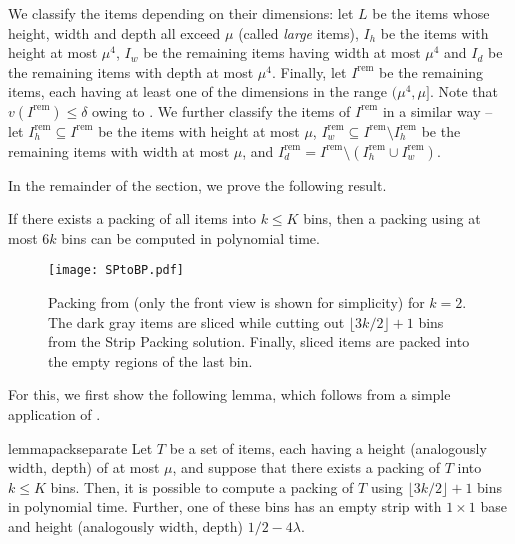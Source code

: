 \documentclass[a4paper,UKenglish,cleveref, autoref, thm-restate]{lipics-v2021}
\renewcommand{\epsilon}{\lambda}
\begin{document}
We classify the items depending on their dimensions: let $L$ be the items whose height, width and depth all exceed $\mu$ (called \emph{large} items), $I_h$ be the items with height at most $\mu^4$, $I_w$ be the remaining items having width at most $\mu^4$ and $I_d$ be the remaining items with depth at most $\mu^4$. Finally, let $I^{\text{rem}}$ be the remaining items, each having at least one of the dimensions in the range $(\mu^4,\mu]$. Note that $v(I^{\text{rem}})\le \delta$ owing to . We further classify the items of $I^{\text{rem}}$ in a similar way -- let $I^{\text{rem}}_h \subseteq I^{\text{rem}}$ be the items with height at most $\mu$, $I^{\text{rem}}_w \subseteq I^{\text{rem}}\setminus I^{\text{rem}}_h$ be the remaining items with width at most $\mu$, and $I^{\text{rem}}_d = I^{\text{rem}} \setminus (I^{\text{rem}}_h \cup I^{\text{rem}}_w)$.




In the remainder of the section, we prove the following result.

\begin{proposition}
\label{pro:sixapprox}
    If there exists a packing of all items into $k\le K$ bins, then a packing using at most $6k$ bins can be computed in polynomial time.
\end{proposition}

\begin{figure}
    \centering
    \texttt{[image: SPtoBP.pdf]}
    \caption{Packing from  (only the front view is shown for simplicity) for $k=2$. The dark gray items are sliced while cutting out $\lfloor 3k/2 \rfloor+1 $ bins from the Strip Packing solution. Finally, sliced items are packed into the empty regions of the last bin.}
    \label{fig:sptobp}
\end{figure}

For this, we first show the following lemma, which follows from a simple application of . 


\begin{restatable}{lemma}{packseparate}
\label{thm:packseparate}
    Let $T$ be a set of items, each having a height (analogously width, depth) of at most $\mu$, and suppose that there exists a packing of $T$ into $k\le K$ bins. Then, it is possible to compute a packing of $T$ using $\lfloor 3k/2 \rfloor + 1$ bins in polynomial time. Further, one of these bins has an empty strip with $1\times 1$ base and height (analogously width, depth) $1/2-4\epsilon$. 
\end{restatable}
\end{document}
